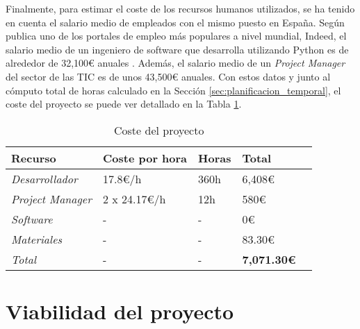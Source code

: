 \bigskip
Finalmente, para estimar el coste de los recursos
humanos utilizados, se ha tenido en cuenta el salario medio de empleados con el mismo puesto en España. Según publica
uno de los portales de empleo más populares a nivel mundial, Indeed, el salario medio de un ingeniero de software que desarrolla
utilizando Python es de alrededor de 32,100€ anuales \cite{indeedsalario}. Además, el salario medio de un \textit{Project Manager}
del sector de las TIC es de unos 43,500€ anuales. Con estos datos y junto al cómputo total de horas calculado en la Sección \ref{sec:planificacion_temporal},
el coste del proyecto se puede ver detallado en la Tabla \ref{tab:costes}.

\bigskip
\begin{table}[H]
	\centering
	\begin{tabular}{|l|l|l|l|l|}
		\rowcolor{udcpink!25}
		\hline
		\small \textbf{Recurso} & \small \textbf{Coste por hora} & \small \textbf{Horas} & \small \textbf{Total} \\ \hline
		\small \textit{Desarrollador} & \small 17.8€/h & \small 360h & \small 6,408€ \\ \hline
		\small \textit{Project Manager} & \small 2 x 24.17€/h & \small 12h & \small 580€ \\ \hline
		\small \textit{Software} & \small - & \small - & \small 0€ \\ \hline
		\small \textit{Materiales} & \small - & \small - & \small 83.30€ \\ \hline
		\small \textit{Total} & \small - & \small - & \small \textbf{7,071.30€} \\ \hline
	\end{tabular}
	\caption{Coste del proyecto}
	\label{tab:costes}
\end{table}

\section{Viabilidad del proyecto}
